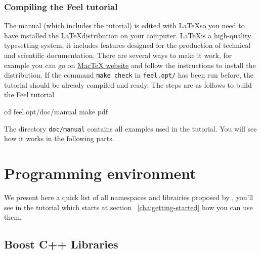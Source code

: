 \subsubsection{Compiling the Feel tutorial}
\label{sec:comp-feel-tutor}
The manual (which includes the tutorial) is edited with \LaTeX  so you need to have installed the \LaTeX  distribution on your computer. \LaTeX  is a high-quality typesetting system, it includes features designed for the production of technical and scientific documentation. There are several ways to make it work, for example you can go on \href{http://www.tug.org/mactex/}{MacTeX website} and follow the instructions to install the distribution. If the command \lstinline|make check| in \lstinline|feel.opt/| has been run before, the tutorial
should be already compiled and ready. The steps are as follows to build the Feel tutorial
\begin{unixcom}
  cd feel.opt/doc/manual
  make pdf
\end{unixcom}
%
The directory \lstinline|doc/manual| contains all examples used in the tutorial. You will see how it works in the following parts.

\section{Programming environment}
\label{sec:progr-envir}
We present here a quick list of all namespaces and librairies proposed by \feel, you'll see in the tutorial which starts at section ~\ref{cha:getting-started} how you can use them.
\subsection{Boost C++ Libraries}
\label{sec:boost-c++-libraries}


